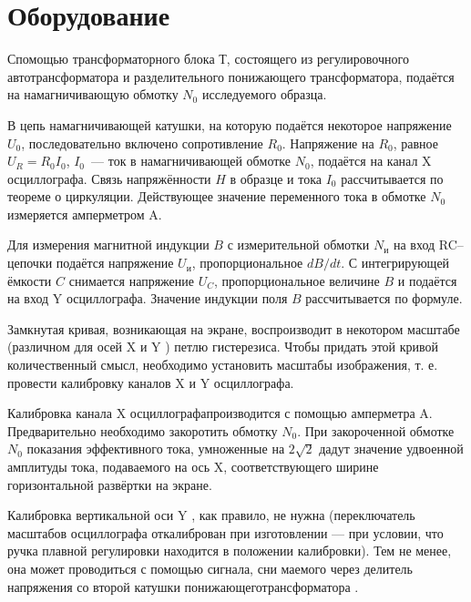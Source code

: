 \section{Оборудование}
\begin{figure}[ht!]
\end{figure}
Спомощью трансформаторного блока Т, состоящего из регулировочного автотрансформатора и разделительного понижающего трансформатора, подаётся на намагничивающую обмотку $N_{0}$  исследуемого образца.

В цепь намагничивающей катушки, на которую подаётся некоторое напряжение $U_{0}$,
последовательно включено сопротивление $R_{0}$.
Напряжение на $R_{0}$, равное $U_{R} = R_{0}I_{0}$, $I_{0}$~--- ток в намагничивающей обмотке $N_{0}$,  подаётся на канал X осциллографа. Связь напряжённости $H$ в образце и тока $I_{0}$ рассчитывается по теореме о циркуляции.
Действующее значение переменного тока в обмотке $N_{0}$ измеряется амперметром A.

Для измерения магнитной индукции $B$  с измерительной обмотки $N_{\text{и}}$ на вход RC--цепочки подаётся напряжение $U_{\text{и}}$, пропорциональное $dB/dt$. С интегрирующей ёмкости $C$  снимается напряжение $U_{C}$, пропорциональное величине $B$ и подаётся на вход Y осциллографа. Значение индукции поля $B$ рассчитывается по формуле.

Замкнутая кривая, возникающая на экране, воспроизводит в некотором масштабе (различном для осей X и Y ) петлю гистерезиса. Чтобы придать этой кривой количественный смысл, необходимо установить масштабы изображения, т. е. провести калибровку каналов X и Y осциллографа.

Калибровка канала X осциллографапроизводится с помощью амперметра A. Предварительно необходимо закоротить обмотку $N_{0}$. При закороченной
 обмотке $N_{0}$ показания эффективного тока, умноженные на $2\sqrt 2$ дадут значение удвоенной амплитуды тока, подаваемого на ось X, соответствующего ширине горизонтальной развёртки на экране.

Калибровка вертикальной оси Y , как правило, не нужна (переключатель масштабов осциллографа откалиброван при изготовлении — при условии, что ручка плавной регулировки находится в положении калибровки). Тем не менее, она может проводиться с помощью сигнала, сни маемого через делитель напряжения со второй катушки понижающеготрансформатора .
